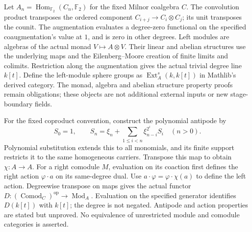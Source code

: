 \begin{definition}
  \label{def:milnor-left-module-ext}
  Let $A_n=\operatorname{Hom}_{\mathbb F_2}(C_n,\mathbb F_2)$ for the
  fixed Milnor coalgebra $C$. The convolution product transposes the
  ordered component $C_{i+j}\to C_i\otimes C_j$; its unit transposes the
  counit. The augmentation evaluates a degree-zero functional on the
  specified coaugmentation's value at $1$, and is zero in other degrees.
  Left modules are algebras of the actual monad $V\mapsto A\otimes V$.
  Their linear and abelian structures use the underlying maps and the
  Eilenberg--Moore creation of finite limits and colimits. Restriction along
  the augmentation gives the actual trivial degree line $k[t]$. Define
  the left-module sphere groups as $\operatorname{Ext}_A^s(k,k[t])$ in
  Mathlib's derived category. The monad, algebra and abelian structure
  property proofs remain obligations; these objects are not additional
  external inputs or new stage-boundary fields.
\end{definition}

\begin{definition}
  \label{def:milnor-contravariant-dualization}
  For the fixed coproduct convention, construct the polynomial antipode by
  \[
    S_0=1,\qquad
    S_n=\xi_n+\sum_{1\leq i<n}\xi_{n-i}^{2^i}S_i\quad(n>0).
  \]
  Polynomial substitution extends this to all monomials, and its finite
  support restricts it to the same homogeneous carriers. Transpose this
  map to obtain $\chi:A\to A$. For a right comodule $M$, evaluation on
  its coaction first defines the right action $\varphi\cdot a$ on its
  same-degree dual. Use $a\cdot\varphi=\varphi\cdot\chi(a)$ to define
  the left action. Degreewise transpose on maps gives the actual functor
  $D:(\operatorname{Comod}_C)^{\mathrm{op}}\to\operatorname{Mod}_A$.
  Evaluation on the specified generator identifies $D(k[t])$ with $k[t]$;
  the degree is not negated. Antipode and action properties are stated but
  unproved. No equivalence of unrestricted module and comodule categories
  is asserted.
\end{definition}

